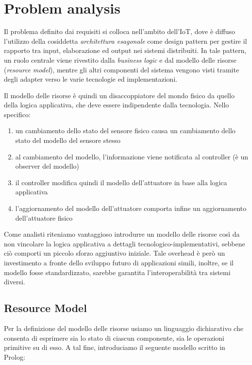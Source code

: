 \documentclass{../llncs}
\newcommand{\labelsec}[1]{\label{sec:#1}}
\begin{document}
\section{Problem analysis}
\labelsec{ProblemAnalysis}
Il problema definito dai requisiti si colloca nell'ambito dell'IoT, dove è diffuso l'utilizzo della cosiddetta \emph{architettura esagonale} come design pattern per gestire il rapporto tra input, elaborazione ed output nei sistemi distribuiti. In tale pattern, un ruolo centrale viene rivestito dalla \emph{business logic} e dal modello delle risorse (\emph{resource model}), mentre gli altri componenti del sistema vengono visti tramite degli adapter verso le varie tecnologie ed implementazioni.

Il modello delle risorse è quindi un disaccoppiatore del mondo fisico da quello della logica applicativa, che deve essere indipendente dalla tecnologia. Nello specifico:
\begin{enumerate}
\item un cambiamento dello stato del sensore fisico causa un cambiamento dello stato del modello del sensore stesso
\item al cambiamento del modello, l'informazione viene notificata al controller (è un observer del modello)
\item il controller modifica quindi il modello dell'attuatore in base alla logica applicativa
\item l'aggiornamento del modello dell'attuatore comporta infine un aggiornamento dell'attuatore fisico
\end{enumerate}

Come analisti riteniamo vantaggioso introdurre un modello delle risorse così da non vincolare la logica applicativa a dettagli tecnologico-implementativi, sebbene ciò comporti un piccolo sforzo aggiuntivo iniziale. Tale overhead è però un investimento a fronte dello sviluppo futuro di applicazioni simili, inoltre, se il modello fosse standardizzato, sarebbe garantita l'interoperabilità tra sistemi diversi.

\subsection{Resource Model}
Per la definizione del modello delle risorse usiamo un linguaggio dichiarativo che consenta di esprimere sia lo stato di ciascun componente, sia le operazioni primitive su di esso. A tal fine, introduciamo il seguente modello scritto in Prolog:\\
\end{document}
